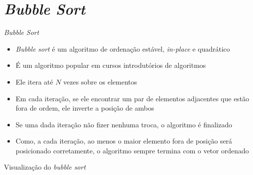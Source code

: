 \section{\it Bubble Sort}

\begin{frame}[fragile]{\it Bubble Sort}

    \begin{itemize}
        \item \textit{Bubble sort} é um algoritmo de ordenação estável, \textit{in-place} e
            quadrático

        \item É um algoritmo popular em cursos introdutórios de algoritmos

        \item Ele itera até $N$ vezes sobre os elementos

        \item Em cada iteração, se ele encontrar um par de elementos adjacentes que estão
            fora de ordem, ele inverte a posição de ambos

        \item Se uma dada iteração não fizer nenhuma troca, o algoritmo é finalizado

        \item Como, a cada iteração, ao menos o maior elemento fora de posição será 
            posicionado corretamente, o algoritmo sempre termina com o vetor ordenado
    \end{itemize}

\end{frame}

\begin{frame}[fragile]{Visualização do {\it bubble sort}}


\end{frame}

